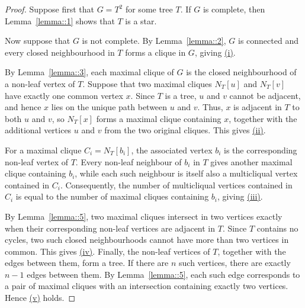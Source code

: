 \documentclass[11pt]{report}
\begin{document}
\begin{proof}
  Suppose first that $G = T^2$ for some tree $T$. If $G$ is complete, then Lemma~\ref{lemma::1} shows that $T$ is a star.

  Now suppose that $G$ is not complete. By Lemma~\ref{lemma::2}, $G$ is connected and every closed neighbourhood in $T$ forms a clique in $G$, giving \hyperref[characterization::1]{(i)}. 

  By Lemma~\ref{lemma::3}, each maximal clique of $G$ is the closed neighbourhood of a non-leaf vertex of $T$. Suppose that two maximal cliques $N_T[u]$ and $N_T[v]$ have exactly one common vertex $x$. Since $T$ is a tree, $u$ and $v$ cannot be adjacent, and hence $x$ lies on the unique path between $u$ and $v$. Thus, $x$ is adjacent in $T$ to both $u$ and $v$, so $N_T[x]$ forms a maximal clique containing $x$, together with the additional vertices $u$ and $v$ from the two original cliques. This gives \hyperref[characterization::2]{(ii)}.

  For a maximal clique $C_i=N_T[b_i]$, the associated vertex $b_i$ is the corresponding non-leaf vertex of $T$. Every non-leaf neighbour of $b_i$ in $T$ gives another maximal clique containing $b_i$, while each such neighbour is itself also a multicliqual vertex contained in $C_i$. Consequently, the number of multicliqual vertices contained in $C_i$ is equal to the number of maximal cliques containing $b_i$, giving \hyperref[characterization::3]{(iii)}.
  
  By Lemma~\ref{lemma::5}, two maximal cliques intersect in two vertices exactly when their corresponding non-leaf vertices are adjacent in $T$. Since $T$ contains no cycles, two such closed neighbourhoods cannot have more than two vertices in common. This gives \hyperref[characterization::4]{(iv)}. Finally, the non-leaf vertices of $T$, together with the edges between them, form a tree. If there are $n$ such vertices, there are exactly $n-1$ edges between them. By Lemma~\ref{lemma::5}, each such edge corresponds to a pair of maximal cliques with an intersection containing exactly two vertices. Hence \hyperref[characterization::5]{(v)} holds.


\end{proof}
\end{document}

